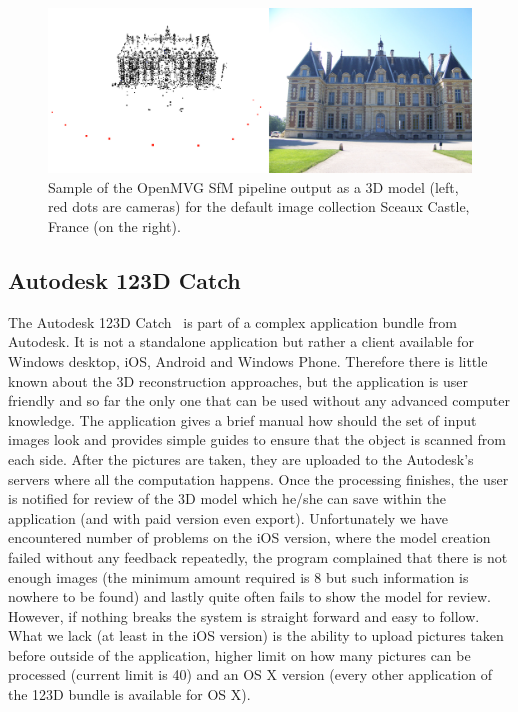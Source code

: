 \begin{figure}[ht]
	\begin{center}
		\includegraphics[keepaspectratio,width=\textwidth]{fig/openmvg.pdf}
	\end{center}
	\caption{Sample of the OpenMVG SfM pipeline output as a 3D model (left, red dots are cameras) for the default image collection Sceaux Castle, France (on the right).}
	\label{fig:openvmg}
\end{figure}

\subsection*{Autodesk 123D Catch}
The Autodesk 123D Catch~\cite{123dcatch} is part of a complex application bundle from Autodesk. It is not a standalone application but rather a client available for Windows desktop, iOS, Android and Windows Phone. Therefore there is little known about the 3D reconstruction approaches, but the application is user friendly and so far the only one that can be used without any advanced computer knowledge. The application gives a brief manual how should the set of input images look and provides simple guides to ensure that the object is scanned from each side. After the pictures are taken, they are uploaded to the Autodesk's servers where all the computation happens. Once the processing finishes, the user is notified for review of the 3D model which he/she can save within the application (and with paid version even export). Unfortunately we have encountered number of problems on the iOS version, where the model creation failed without any feedback repeatedly, the program complained that there is not enough images (the minimum amount required is 8 but such information is nowhere to be found) and lastly quite often fails to show the model for review. However, if nothing breaks the system is straight forward and easy to follow. What we lack (at least in the iOS version) is the ability to upload pictures taken before outside of the application, higher limit on how many pictures can be processed (current limit is 40) and an OS X version (every other application of the 123D bundle is available for OS X).

